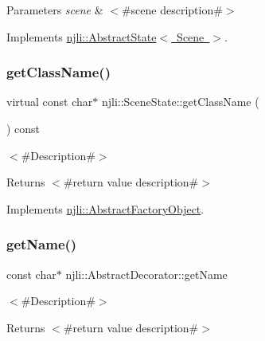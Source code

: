 \begin{DoxyParams}{Parameters}
{\em scene} & $<$\#scene description\#$>$ \\
\hline
\end{DoxyParams}


Implements \mbox{\hyperlink{classnjli_1_1_abstract_state_a75207a4c62f813d8d84168024a30c60a}{njli\+::\+Abstract\+State$<$ Scene $>$}}.

\mbox{\label{classnjli_1_1_scene_state_afde64dfd84a8b1cd1b648225231e7ae7}} 
\subsubsection{\texorpdfstring{get\+Class\+Name()}{getClassName()}}
{\footnotesize\ttfamily virtual const char$\ast$ njli\+::\+Scene\+State\+::get\+Class\+Name (\begin{DoxyParamCaption}{ }\end{DoxyParamCaption}) const\hspace{0.3cm}{\ttfamily [virtual]}}

$<$\#\+Description\#$>$

\begin{DoxyReturn}{Returns}
$<$\#return value description\#$>$ 
\end{DoxyReturn}


Implements \mbox{\hyperlink{classnjli_1_1_abstract_factory_object_af4151e41b80d5bc3fc42822c67fc2278}{njli\+::\+Abstract\+Factory\+Object}}.

\mbox{\label{classnjli_1_1_scene_state_ad41266885be835f3ee602311e20877a4}} 
\subsubsection{\texorpdfstring{get\+Name()}{getName()}}
{\footnotesize\ttfamily const char$\ast$ njli\+::\+Abstract\+Decorator\+::get\+Name}

$<$\#\+Description\#$>$

\begin{DoxyReturn}{Returns}
$<$\#return value description\#$>$ 
\end{DoxyReturn}
\mbox{\label{classnjli_1_1_scene_state_ac4ca71716ed832be357f15f8262c8448}} 
